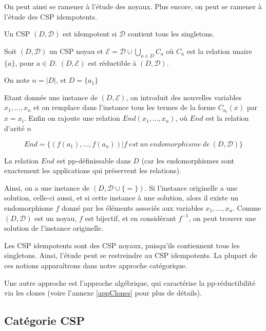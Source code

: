 On peut ainsi se ramener à l'étude des noyaux. Plus encore, on peut se ramener
à l'étude des CSP idempotents.

\begin{defi}{}
Un CSP $(D,\mathcal{D})$ est idempotent si $\mathcal{D}$ contient tous les singletons.
\end{defi}

\begin{theo}{}
    Soit $(D,\mathcal{D})$ un CSP noyau et $\mathcal{E} = \mathcal{D} \cup
    \bigcup_{a \in D} C_a$ où $C_a$ est la relation unaire $\{a\}$, pour $a \in
    D$. $(D,\mathcal{E})$ est réductible à $(D,\mathcal{D})$.
\end{theo}

\begin{pv}
    On note $n=|D| $, et $D=\{a_1\}$

    Etant donnée une instance de $(D,\mathcal{E})$, on introduit des nouvelles
    variables $x_1,\dots,x_n$ et on remplace dans l'instance tous les termes de
    la forme $C_{a_i}(x)$ par $x=x_i$. Enfin on rajoute une relation
    $End(x_1,\dots,x_n)$, où $End$ est la relation d'arité $n$ 

    $$ End = \{(f(a_1),\dots,f(a_n))| f\ est\ un\ endomorphisme\ de\
    (D,\mathcal{D})\}$$

    La relation $End$ est pp-définissable dans $D$ (car les endomorphismes sont
    exactement les applications qui préservent les relations). 

    Ainsi, on a une instance de $(D,\mathcal{D} \cup \{=\})$. Si l'instance
    originelle a une solution, celle-ci aussi, et si cette instance à une
    solution, alors il existe un endomorphisme $f$ donné par les éléments
    associés aux variables $x_1,\dots,x_n$. Comme $(D,\mathcal{D})$ est un
    noyau, $f$ est bijectif, et en considérant $f^{-1}$, on peut trouver une
    solution de l'instance originelle.
\end{pv}

Les CSP idempotents sont des CSP noyaux, puisqu'ils contiennent tous les
singletons. Ainsi, l'étude peut se restreindre au CSP idempotents. La plupart
de ces notions apparaîtrons dans notre approche catégorique.

Une autre approche est l'approche algébrique, qui caractérise la
pp-réductibilité via les clones (voire l'annexe \ref{appClones} pour plus de
détails).

\subsection{Catégorie CSP}

